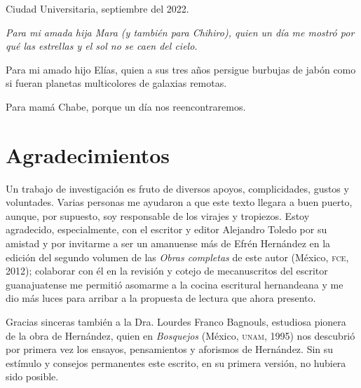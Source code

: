 \documentclass[14pt,twoside,final]{extbook} %
\begin{document}
\vfill
\begin{center}
\large Ciudad Universitaria, septiembre del 2022.
\end{center}
\newpage
\pagestyle{empty}
\null\vfill
\newpage
\pagestyle{empty}
\protect{}
{}
\vspace*{42pt}
\begin{flushright}
\begin{minipage}{7.5cm}
\em Para mi amada hija Mara (y también para Chihiro), quien un día me mostró por qué las estrellas y el sol no se caen del cielo.
\begin{center}
\end{center}
Para mi amado hijo Elías, quien a sus tres años persigue burbujas de jabón como si fueran planetas multicolores de galaxias remotas.
\begin{center}
\end{center}
Para mamá Chabe, porque un día nos reencontraremos.
\end{minipage}
\end{flushright}
\newpage
\pagestyle{empty}
\null\vfill
\chapter*{Agradecimientos}\label{ch:agradecimientos}
\thispagestyle{empty}
\pagestyle{fancy}
\fancyhf{} %
\fancyhead[LE,RO]{\thepage}
\renewcommand{\headrulewidth}{0pt}
Un trabajo de investigación es fruto de diversos apoyos, complicidades, gustos y voluntades. Varias personas me ayudaron a que este texto llegara a buen puerto, aunque, por supuesto, soy responsable de los virajes y tropiezos. Estoy agradecido, especialmente, con el escritor y editor Alejandro Toledo por su amistad y por invitarme a ser un amanuense más de Efrén Hernández en la edición del segundo volumen de las \emph{Obras completas} de este autor (México, \textsc{fce}, 2012); colaborar con él en la revisión y cotejo de mecanuscritos del escritor guanajuatense me permitió asomarme a la cocina escritural hernandeana y me dio más luces para arribar a la propuesta de lectura que ahora presento.

Gracias sinceras también a la Dra. Lourdes Franco Bagnouls, estudiosa pionera de la obra de Hernández, quien en \emph{Bosquejos} (México, \textsc{unam}, 1995) nos descubrió por primera vez los ensayos, pensamientos y aforismos de Hernández. Sin su estímulo y consejos permanentes este escrito, en su primera versión, no hubiera sido posible.
\end{document}

